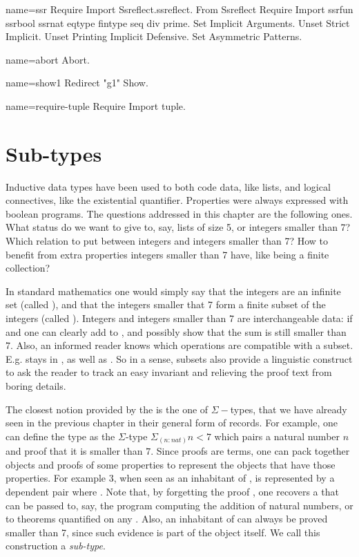 \begin{coqdef}{name=ssr}
Require Import Ssreflect.ssreflect.
From Ssreflect Require Import ssrfun ssrbool ssrnat eqtype fintype seq div prime.
Set Implicit Arguments.
Unset Strict Implicit.
Unset Printing Implicit Defensive.
Set Asymmetric Patterns.
\end{coqdef}
\begin{coqdef}{name=abort}
Abort.
\end{coqdef}
\begin{coqdef}{name=show1}
Redirect "g1" Show.
\end{coqdef}
\begin{coqdef}{name=require-tuple}
Require Import tuple.
\end{coqdef}

\chapter{Sub-types}{}\label{ch:sigmabool}

Inductive data types have been used to both code data, like lists, and
logical connectives, like the existential quantifier.
Properties were always expressed with
boolean programs.  The questions addressed in this chapter are the
following ones.  What
status do we want to give to, say, lists of size 5,  or integers
smaller than 7?  Which relation to put between integers and
integers smaller than 7?  How to benefit from extra properties
integers smaller than 7 have, like being a finite collection?

In standard mathematics one would simply say that the integers are an
infinite set (called ), and that the integers smaller that 7
form a finite subset of the integers (called ).  Integers and
integers smaller than 7 are interchangeable data: if  and
 one can clearly add  to , and possibly show
that the sum is still smaller than 7.  Also, an informed reader
knows which operations are compatible with a subset. E.g. 
stays in , as well as .  So in a sense, subsets
also provide a linguistic construct to ask the reader to track an
easy invariant and relieving the proof text from boring details.

The closest notion provided by the \mcbCIC{} is the one of $\Sigma-$types,
that we have already seen in the previous chapter in their general
form of records.
For example, one can define the type  as the $\Sigma$-type $\Sigma_{(n:nat)} n
< 7$ which pairs a natural number $n$ and proof that it is smaller than $7$.  Since proofs are terms, one can
pack together objects and proofs of some properties to
represent the objects that have those properties.  For example $3$,
when seen as an inhabitant of , is represented by a dependent
pair  where .  Note that, by forgetting the
proof , one recovers a  that can be passed to, say, the
program computing the addition of natural numbers, or to theorems
quantified on any .  Also, an inhabitant of  can always
be proved smaller than 7, since such evidence is part of the
object itself.
We call this construction a \emph{sub-type}.

